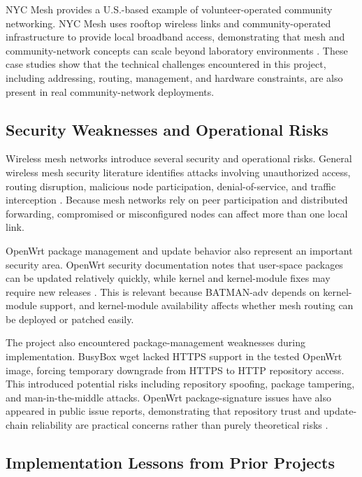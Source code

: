 \documentclass[conference]{IEEEtran}
\begin{document}
NYC Mesh provides a U.S.-based example of volunteer-operated community networking. NYC Mesh uses rooftop wireless links and community-operated infrastructure to provide local broadband access, demonstrating that mesh and community-network concepts can scale beyond laboratory environments \cite{nycmeshcase}. These case studies show that the technical challenges encountered in this project, including addressing, routing, management, and hardware constraints, are also present in real community-network deployments.

\subsection{Security Weaknesses and Operational Risks}

Wireless mesh networks introduce several security and operational risks. General wireless mesh security literature identifies attacks involving unauthorized access, routing disruption, malicious node participation, denial-of-service, and traffic interception \cite{wmnsecurity}. Because mesh networks rely on peer participation and distributed forwarding, compromised or misconfigured nodes can affect more than one local link.

OpenWrt package management and update behavior also represent an important security area. OpenWrt security documentation notes that user-space packages can be updated relatively quickly, while kernel and kernel-module fixes may require new releases \cite{openwrtsecurity}. This is relevant because BATMAN-adv depends on kernel-module support, and kernel-module availability affects whether mesh routing can be deployed or patched easily.

The project also encountered package-management weaknesses during implementation. BusyBox wget lacked HTTPS support in the tested OpenWrt image, forcing temporary downgrade from HTTPS to HTTP repository access. This introduced potential risks including repository spoofing, package tampering, and man-in-the-middle attacks. OpenWrt package-signature issues have also appeared in public issue reports, demonstrating that repository trust and update-chain reliability are practical concerns rather than purely theoretical risks \cite{openwrtsigissue}.

\subsection{Implementation Lessons from Prior Projects}
\end{document}
